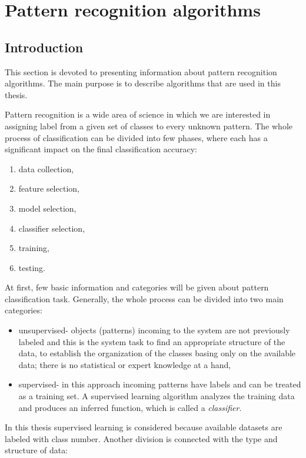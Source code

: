 \section{Pattern recognition algorithms}
\label{cha:Introduction}
\subsection{Introduction}
This section is devoted to presenting information about pattern recognition
algorithms. The main purpose is to describe algorithms that are used in this
thesis. 

Pattern recognition is a wide area of science in which we are interested in
assigning label from a given set of classes to every unknown pattern. The whole 
process of classification can be divided into few phases, where each has a
significant impact on the final classification accuracy:
\begin{enumerate}
    \item data collection,
    \item feature selection,
    \item model selection,
    \item classifier selection,
    \item training,
    \item testing.
\end{enumerate}
At first, few basic information and categories will be given 
about pattern classification task. Generally, the whole process
can be divided into two main categories:
\begin{itemize}
    \item unsupervised- objects (patterns) incoming to the system are not previously
        labeled and this is the system task to find an appropriate structure of
        the data, to establish the organization of the classes basing only on
        the available data; there is no statistical or expert knowledge at a
        hand,
    \item supervised- in this approach incoming patterns have labels and can
        be treated as a training set. A supervised learning algorithm analyzes the 
        training data and produces an inferred function, which is called a
        \textit{classifier}.
\end{itemize}
In this thesis supervised learning is considered because available datasets 
are labeled with class number. Another division is connected with the type and
structure of data:
